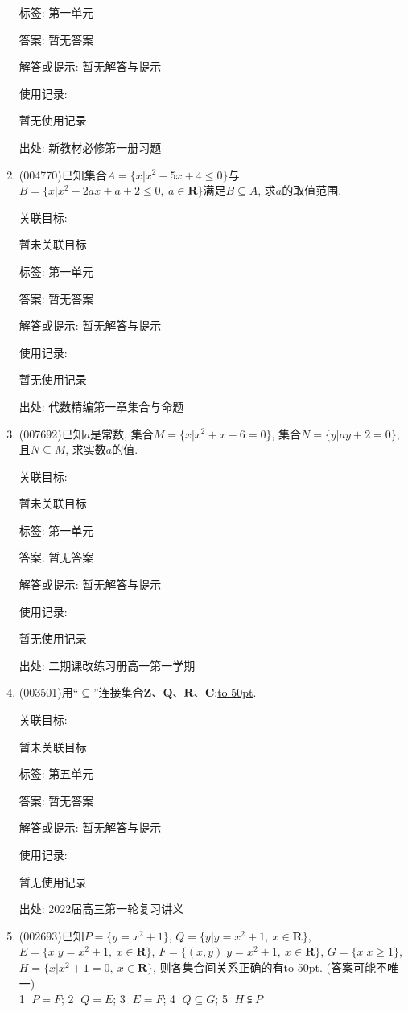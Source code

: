 \documentclass[10pt,a4paper]{article}
\newcommand{\blank}[1]{\underline{\hbox to #1pt{}}}
\begin{document}
\begin{enumerate}[1.]
标签: 第一单元

答案: 暂无答案

解答或提示: 暂无解答与提示

使用记录:

暂无使用记录


出处: 新教材必修第一册习题
\item { (004770)}已知集合$A=\{x|x^2-5x+4\le 0\}$与$B=\{x|x^2-2ax+a+2\le 0,\ a\in \mathbf{R}\}$满足$B\subseteq A$, 求$a$的取值范围.


关联目标:

暂未关联目标



标签: 第一单元

答案: 暂无答案

解答或提示: 暂无解答与提示

使用记录:

暂无使用记录


出处: 代数精编第一章集合与命题
\item { (007692)}已知$a$是常数, 集合$M=\{x|x^2+x-6=0\}$, 集合$N=\{y|ay+2=0\}$, 且$N\subseteq M$, 求实数$a$的值.


关联目标:

暂未关联目标



标签: 第一单元

答案: 暂无答案

解答或提示: 暂无解答与提示

使用记录:

暂无使用记录


出处: 二期课改练习册高一第一学期
\item { (003501)}用``$\subseteq$''连接集合$\mathbf{Z}$、$\mathbf{Q}$、$\mathbf{R}$、$\mathbf{C}$:\blank{50}.


关联目标:

暂未关联目标



标签: 第五单元

答案: 暂无答案

解答或提示: 暂无解答与提示

使用记录:

暂无使用记录


出处: 2022届高三第一轮复习讲义
\item { (002693)}已知$P=\{y=x^2+1\}$, $Q=\{y|y=x^2+1, \ x\in \mathbf{R}\}$, $E=\{x|y=x^2+1, \  x\in \mathbf{R}\}$, $F=\{(x,y)|y=x^2+1, \ x\in \mathbf{R}\}$, $G=\{x|x\ge 1\}$, $H=\{x|x^2+1=0, \ x\in \mathbf{R}\}$, 则各集合间关系正确的有\blank{50}. (答案可能不唯一)\\
\textcircled{1} $P=F$; \textcircled{2} $Q=E$; \textcircled{3} $E=F$; \textcircled{4} $Q\subseteq G$; \textcircled{5} $H\subsetneqq P$



\end{enumerate}
\end{document}

